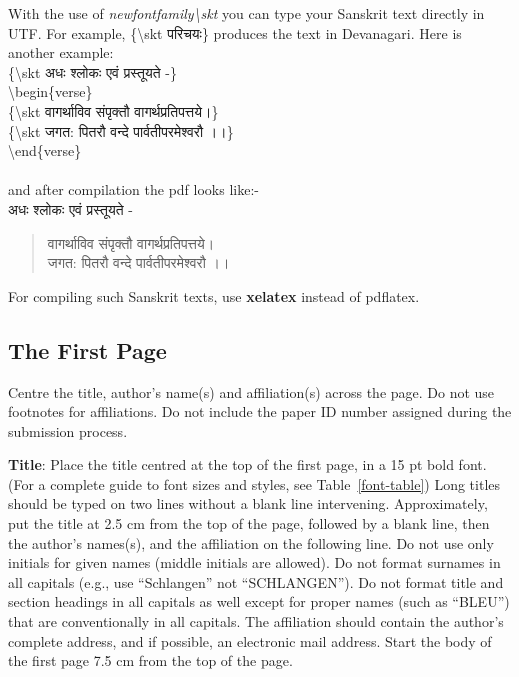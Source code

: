 \documentclass[11pt]{article}
\begin{document}
With the use of {\it newfontfamily\textbackslash skt} you can type your Sanskrit text directly in UTF.
For example, \{\textbackslash skt {\skt परिचयः}\} produces the text in Devanagari. Here is another example:\\
\{\textbackslash skt {\skt अधः श्लोकः एवं प्रस्तूयते -}\}\\
\textbackslash begin\{verse\}\\
\{\textbackslash skt {\skt वागर्थाविव संपृक्तौ वागर्थप्रतिपत्तये।}\}\\
\{\textbackslash skt {\skt जगत: पितरौ वन्दे पार्वतीपरमेश्वरौ ।।}\}\\
\textbackslash end\{verse\}\\\\
and after compilation the pdf looks like:- \\
{\skt अधः श्लोकः एवं प्रस्तूयते -}
\begin{verse}
{\skt वागर्थाविव संपृक्तौ वागर्थप्रतिपत्तये।}\\
{\skt जगत: पितरौ वन्दे पार्वतीपरमेश्वरौ ।।}
\end{verse}
For compiling such Sanskrit texts, use {\bf xelatex} instead of pdflatex.

\subsection{The First Page}
\label{ssec:first}

Centre the title, author's name(s) and affiliation(s) across
the page.
Do not use footnotes for affiliations. Do not include the
paper ID number assigned during the submission process.

{\bf Title}: Place the title centred at the top of the first page, in
a 15 pt bold font. (For a complete guide to font sizes and styles,
see Table~\ref{font-table}) Long titles should be typed on two lines
without a blank line intervening. Approximately, put the title at 2.5
cm from the top of the page, followed by a blank line, then the
author's names(s), and the affiliation on the following line. Do not
use only initials for given names (middle initials are allowed). Do
not format surnames in all capitals (e.g., use ``Schlangen'' not
``SCHLANGEN'').  Do not format title and section headings in all
capitals as well except for proper names (such as ``BLEU'') that are
conventionally in all capitals.  The affiliation should contain the
author's complete address, and if possible, an electronic mail
address. Start the body of the first page 7.5 cm from the top of the
page.
\end{document}
